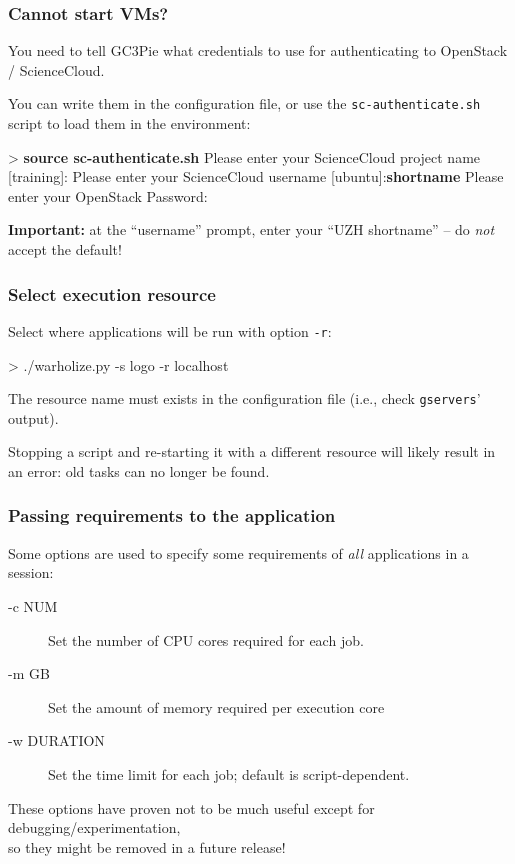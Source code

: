 \documentclass[english,serif,mathserif,usenames,dvipsnames]{beamer}
\begin{document}
\begin{frame}[fragile]
  \frametitle{Cannot start VMs?}

  You need to tell GC3Pie what credentials to use for authenticating to
  OpenStack / ScienceCloud.

  You can write them in the configuration file, or use the
  \texttt{sc-authenticate.sh} script to load them in the environment:
\begin{semiverbatim}\footnotesize
> {\bfseries source sc-authenticate.sh}
Please enter your ScienceCloud project name [training]:
Please enter your ScienceCloud username [ubuntu]:{\bfseries shortname}
Please enter your OpenStack Password:
\end{semiverbatim}

  \textbf{Important:} at the ``username'' prompt, enter your ``UZH shortname''
  -- do \emph{not} accept the default!
\end{frame}


\begin{frame}
  \frametitle{Select execution resource}

  Select where applications will be run with option \texttt{-r}:
\begin{semiverbatim}
    > ./warholize.py -s logo -r localhost
\end{semiverbatim}

  \+ The resource name must exists in the configuration file (i.e.,
  check \texttt{gservers}' output).

  \+ Stopping a script and re-starting it with a different resource
  will likely result in an error: old tasks can no longer be found.
\end{frame}


\begin{frame}
  \frametitle{Passing requirements to the application}
  Some options are used to specify some requirements of \emph{all}
  applications in a session:
  \begin{description}
  \item[-c NUM] Set the number of CPU cores required for each job.
  \item[-m GB] Set the amount of memory required per execution core
  \item[-w DURATION] Set the time limit for each job; default is script-dependent.
  \end{description}

  \+ These options have proven not to be much useful except for
  debugging/experimentation, \\ so \alert{they might be removed in a
    future release!}
\end{frame}
\end{document}
